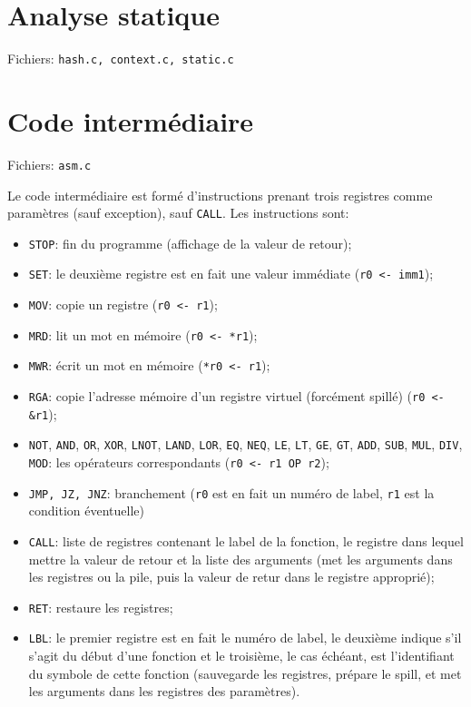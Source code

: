 \documentclass{article}
\begin{document}
	\section{Analyse statique}
		\par Fichiers: \verb#hash.c, context.c, static.c#
	\section{Code intermédiaire}
		\par Fichiers: \verb#asm.c#
		\par Le code intermédiaire est formé d'instructions prenant trois registres comme paramètres (sauf exception), sauf \verb#CALL#. Les instructions sont:
		\begin{itemize}
			\item \verb#STOP#: fin du programme (affichage de la valeur de retour);
			\item \verb#SET#: le deuxième registre est en fait une valeur immédiate (\verb#r0 <- imm1#);
			\item \verb#MOV#: copie un registre (\verb#r0 <- r1#);
			\item \verb#MRD#: lit un mot en mémoire (\verb#r0 <- *r1#);
			\item \verb#MWR#: écrit un mot en mémoire (\verb#*r0 <- r1#);
			\item \verb#RGA#: copie l'adresse mémoire d'un registre virtuel (forcément spillé) (\verb#r0 <- &r1#);
			\item \verb#NOT#, \verb#AND#, \verb#OR#, \verb#XOR#, \verb#LNOT#, \verb#LAND#, \verb#LOR#, \verb#EQ#, \verb#NEQ#, \verb#LE#, \verb#LT#, \verb#GE#, \verb#GT#, \verb#ADD#, \verb#SUB#, \verb#MUL#, \verb#DIV#, \verb#MOD#: les opérateurs correspondants (\verb#r0 <- r1 OP r2#);
			\item \verb#JMP, JZ, JNZ#: branchement (\verb#r0# est en fait un numéro de label, \verb#r1# est la condition éventuelle)
			\item \verb#CALL#: liste de registres contenant le label de la fonction, le registre dans lequel mettre la valeur de retour et la liste des arguments (met les arguments dans les registres ou la pile, puis la valeur de retur dans le registre approprié);
			\item \verb#RET#: restaure les registres;
			\item \verb#LBL#: le premier registre est en fait le numéro de label, le deuxième indique s'il s'agit du début d'une fonction et le troisième, le cas échéant, est l'identifiant du symbole de cette fonction (sauvegarde les registres, prépare le spill, et met les arguments dans les registres des paramètres).
		\end{itemize}
\end{document}
